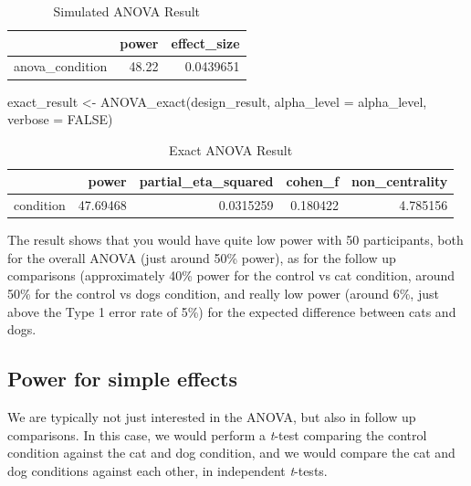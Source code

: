 \documentclass[
]{book}
\newenvironment{Shaded}{\begin{snugshade}}{\end{snugshade}}
\newcommand{\AttributeTok}[1]{\textcolor[rgb]{0.77,0.63,0.00}{#1}}
\newcommand{\ConstantTok}[1]{\textcolor[rgb]{0.00,0.00,0.00}{#1}}
\newcommand{\FunctionTok}[1]{\textcolor[rgb]{0.00,0.00,0.00}{#1}}
\newcommand{\NormalTok}[1]{#1}
\newcommand{\OtherTok}[1]{\textcolor[rgb]{0.56,0.35,0.01}{#1}}
\begin{document}
\begin{table}[!h]

\caption{\label{tab:unnamed-chunk-56}Simulated ANOVA Result}
\centering
\begin{tabular}[t]{l|r|r}
\hline
  & power & effect\_size\\
\hline
anova\_condition & 48.22 & 0.0439651\\
\hline
\end{tabular}
\end{table}

\begin{Shaded}
\begin{Highlighting}[]
\NormalTok{exact\_result }\OtherTok{\textless{}{-}} \FunctionTok{ANOVA\_exact}\NormalTok{(design\_result,}
                            \AttributeTok{alpha\_level =}\NormalTok{ alpha\_level,}
                            \AttributeTok{verbose =} \ConstantTok{FALSE}\NormalTok{)}
\end{Highlighting}
\end{Shaded}

\begin{table}[!h]

\caption{\label{tab:unnamed-chunk-58}Exact ANOVA Result}
\centering
\begin{tabular}[t]{l|r|r|r|r}
\hline
  & power & partial\_eta\_squared & cohen\_f & non\_centrality\\
\hline
condition & 47.69468 & 0.0315259 & 0.180422 & 4.785156\\
\hline
\end{tabular}
\end{table}

The result shows that you would have quite low power with 50 participants, both for the overall ANOVA (just around 50\% power), as for the follow up comparisons (approximately 40\% power for the control vs cat condition, around 50\% for the control vs dogs condition, and really low power (around 6\%, just above the Type 1 error rate of 5\%) for the expected difference between cats and dogs.

\hypertarget{power-for-simple-effects}{%
\subsection{Power for simple effects}\label{power-for-simple-effects}}

We are typically not just interested in the ANOVA, but also in follow up comparisons. In this case, we would perform a \emph{t}-test comparing the control condition against the cat and dog condition, and we would compare the cat and dog conditions against each other, in independent \emph{t}-tests.
\end{document}

